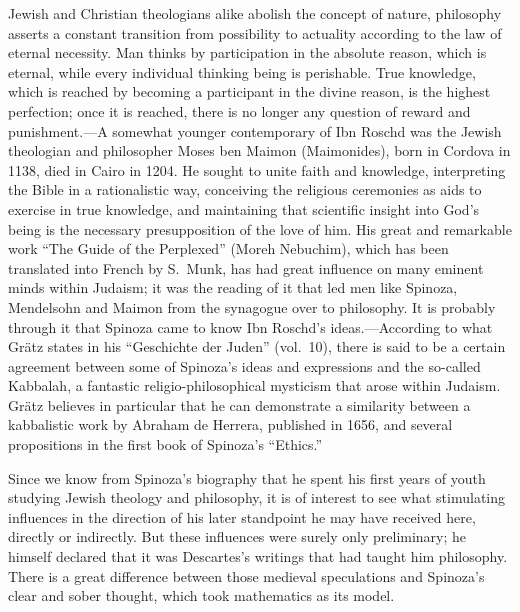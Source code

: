 \documentclass[12pt]{book}
\newcommand{\opage}[1]{\marginnote{\footnotesize\textit{[#1]}}}
\begin{document}
Jewish and Christian theologians alike abolish the concept of nature, philosophy
asserts a constant transition from possibility to actuality according to the law of
eternal necessity. Man thinks by participation in the absolute reason, which is
eternal, while every individual thinking being is perishable. True knowledge, which
is reached by becoming a participant in the divine reason, is the highest
perfection; once it is reached, there is no longer any question of reward and
punishment.---A somewhat younger contemporary of Ibn Roschd was the Jewish
theologian and philosopher Moses ben Maimon (Maimonides), born in Cordova in 1138,
died in Cairo in 1204. He sought to unite faith and knowledge, interpreting the
Bible in a rationalistic way, conceiving the religious ceremonies as aids to
exercise in true knowledge, and maintaining that scientific insight into God's being
is the necessary presupposition of the love of him. His great and remarkable work
``The Guide of the Perplexed'' (Moreh Nebuchim), which has been translated into
French by S.~Munk, has had great influence on many eminent minds within Judaism; it
was the reading of it that led men like Spinoza, Mendelsohn and Maimon from the
synagogue over to philosophy. It is probably through it that Spinoza came to know
Ibn Roschd's ideas.---According to what Grätz states in his ``Geschichte der Juden''
(vol.~10), there is said to be a certain agreement between some of Spinoza's ideas
and \opage{11}expressions and the so-called Kabbalah, a fantastic religio-philosophical
mysticism that arose within Judaism. Grätz believes in particular that he can
demonstrate a similarity between a kabbalistic work by Abraham de Herrera, published
in 1656, and several propositions in the first book of Spinoza's ``Ethics.''

Since we know from Spinoza's biography that he spent his first years of youth
studying Jewish theology and philosophy, it is of interest to see what stimulating
influences in the direction of his later standpoint he may have received here,
directly or indirectly. But these influences were surely only preliminary; he
himself declared that it was Descartes's writings that had taught him philosophy.
There is a great difference between those medieval speculations and Spinoza's clear
and sober thought, which took mathematics as its model.
\end{document}

